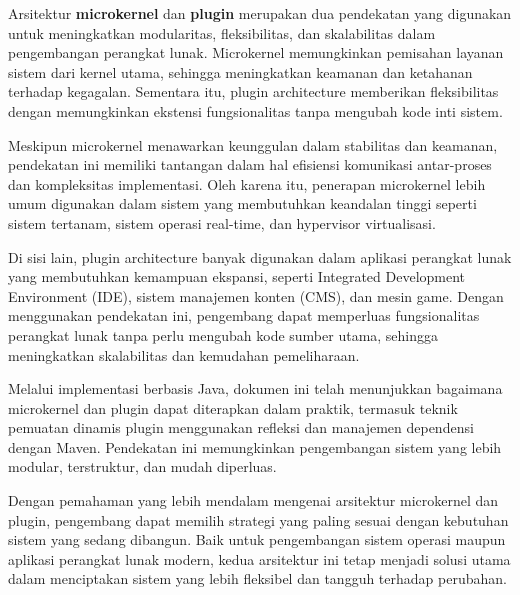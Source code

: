Arsitektur \textbf{microkernel} dan \textbf{plugin} merupakan dua pendekatan yang digunakan untuk meningkatkan modularitas, fleksibilitas, dan skalabilitas dalam pengembangan perangkat lunak. Microkernel memungkinkan pemisahan layanan sistem dari kernel utama, sehingga meningkatkan keamanan dan ketahanan terhadap kegagalan. Sementara itu, plugin architecture memberikan fleksibilitas dengan memungkinkan ekstensi fungsionalitas tanpa mengubah kode inti sistem.

Meskipun microkernel menawarkan keunggulan dalam stabilitas dan keamanan, pendekatan ini memiliki tantangan dalam hal efisiensi komunikasi antar-proses dan kompleksitas implementasi. Oleh karena itu, penerapan microkernel lebih umum digunakan dalam sistem yang membutuhkan keandalan tinggi seperti sistem tertanam, sistem operasi real-time, dan hypervisor virtualisasi.

Di sisi lain, plugin architecture banyak digunakan dalam aplikasi perangkat lunak yang membutuhkan kemampuan ekspansi, seperti Integrated Development Environment (IDE), sistem manajemen konten (CMS), dan mesin game. Dengan menggunakan pendekatan ini, pengembang dapat memperluas fungsionalitas perangkat lunak tanpa perlu mengubah kode sumber utama, sehingga meningkatkan skalabilitas dan kemudahan pemeliharaan.

Melalui implementasi berbasis Java, dokumen ini telah menunjukkan bagaimana microkernel dan plugin dapat diterapkan dalam praktik, termasuk teknik pemuatan dinamis plugin menggunakan refleksi dan manajemen dependensi dengan Maven. Pendekatan ini memungkinkan pengembangan sistem yang lebih modular, terstruktur, dan mudah diperluas.

Dengan pemahaman yang lebih mendalam mengenai arsitektur microkernel dan plugin, pengembang dapat memilih strategi yang paling sesuai dengan kebutuhan sistem yang sedang dibangun. Baik untuk pengembangan sistem operasi maupun aplikasi perangkat lunak modern, kedua arsitektur ini tetap menjadi solusi utama dalam menciptakan sistem yang lebih fleksibel dan tangguh terhadap perubahan.

